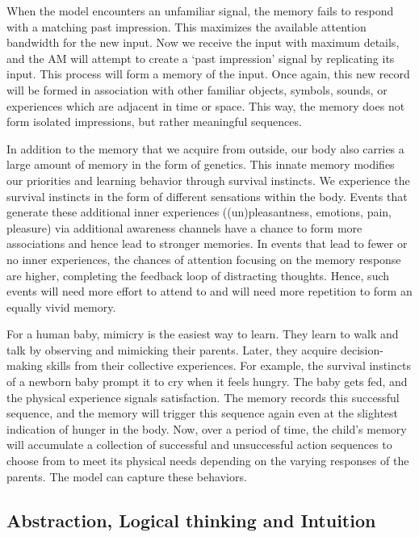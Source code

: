 \documentclass[reprint,amsmath,amssymb,apr,aip,onecolumn, 11pt]{revtex4-1}
\begin{document}
When the model encounters an unfamiliar signal, the memory fails to respond with a matching past impression. This maximizes the available attention bandwidth for the new input. Now we receive the input with maximum details, and the AM will attempt to create a `past impression' signal by replicating its input. This process will form a memory of the input. Once again, this new record will be formed in association with other familiar objects, symbols, sounds, or experiences which are adjacent in time or space. This way, the memory does not form isolated impressions, but rather meaningful sequences. 

In addition to the memory that we acquire from outside, our body also carries a large amount of memory in the form of genetics. This innate memory modifies our priorities and learning behavior through survival instincts. We experience the survival instincts in the form of different sensations within the body. Events that generate these additional inner experiences ((un)pleasantness, emotions, pain, pleasure) via additional awareness channels have a chance to form more associations and hence lead to stronger memories. In events that lead to fewer or no inner experiences, the chances of attention focusing on the memory response are higher, completing the feedback loop of distracting thoughts. Hence, such events will need more effort to attend to and will need more repetition to form an equally vivid memory.

For a human baby, mimicry is the easiest way to learn. They learn to walk and talk by observing and mimicking their parents. Later, they acquire decision-making skills from their collective experiences. For example, the survival instincts of a newborn baby prompt it to cry when it feels hungry. The baby gets fed, and the physical experience signals satisfaction. The memory records this successful sequence, and the memory will trigger this sequence again even at the slightest indication of hunger in the body.  Now, over a period of time, the child's memory will accumulate a collection of successful and unsuccessful action sequences to choose from to meet its physical needs depending on the varying responses of the parents. The model can capture these behaviors. 


\subsection{Abstraction, Logical thinking and Intuition \label{sec:abs_intuition}}
\end{document}
